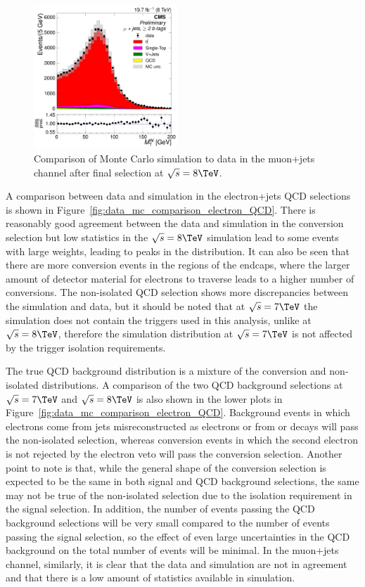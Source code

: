 \begin{figure}[hbtp]
     \includegraphics[width=0.48\textwidth]{Chapters/04_Analysis/04b_XSections/images/control_plots/before_fit/8TeV/MuPlusJets_patType1CorrectedPFMet_MT_2orMoreBtags_with_ratio.pdf}\hfill
     \caption{Comparison of Monte Carlo simulation to data in the muon+jets channel after final
     selection at $\sqrt{s}=8\TeV$.}
     \label{fig:data_mc_comparison_8TeV_muon}
\end{figure}

A comparison between data and simulation in the electron+jets QCD selections is shown in
Figure~\ref{fig:data_mc_comparison_electron_QCD}. There is reasonably good agreement between the data and
simulation in the conversion selection but low statistics in the $\sqrt{s}=8\TeV$ simulation lead to some
events with large weights, leading to peaks in the distribution. It can also be seen that there are more
conversion events in the regions of the endcaps, where the larger amount of detector material for electrons to
traverse leads to a higher number of conversions. The non-isolated QCD selection shows more discrepancies
between the simulation and data, but it should be noted that at $\sqrt{s}=7\TeV$ the simulation does not
contain the triggers used in this analysis, unlike at $\sqrt{s}=8\TeV$, therefore the simulation distribution
at $\sqrt{s}=7\TeV$ is not affected by the trigger isolation requirements.

The true QCD background distribution is a mixture of the conversion and non-isolated distributions. A
comparison of the two QCD background selections at $\sqrt{s}=7\TeV$ and $\sqrt{s}=8\TeV$ is also shown in the
lower plots in Figure~\ref{fig:data_mc_comparison_electron_QCD}. Background events in which electrons come
from jets misreconstructed as electrons or from \bquark or \cquark decays will pass the non-isolated
selection, whereas conversion events in which the second electron is not rejected by the electron veto will
pass the conversion selection. Another point to note is that, while the general shape of the conversion
selection is expected to be the same in both signal and QCD background selections, the same may not be true of
the non-isolated selection due to the isolation requirement in the signal selection. In addition, the number
of events passing the QCD background selections will be very small compared to the number of events passing
the signal selection, so the effect of even large uncertainties in the QCD background on the total number of
events will be minimal. In the muon+jets channel, similarly, it is clear that the data and simulation are not
in agreement and that there is a low amount of statistics available in simulation.

